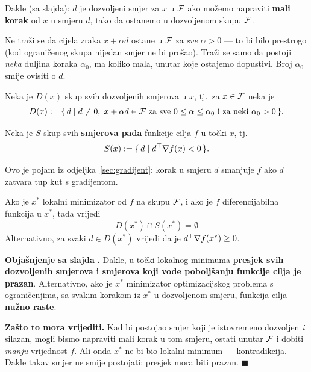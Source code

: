Dakle (sa slajda): $d$ je dozvoljeni smjer za $x$ u $\mathcal{F}$ ako možemo napraviti
\textbf{mali korak} od $x$ u smjeru $d$, tako da ostanemo u dozvoljenom skupu
$\mathcal{F}$.

\begin{napomena}
Ne traži se da cijela zraka $x + \alpha d$ ostane u $\mathcal{F}$ za \emph{sve}
$\alpha > 0$ --- to bi bilo prestrogo (kod ograničenog skupa nijedan smjer ne bi
prošao). Traži se samo da postoji \emph{neka} duljina koraka $\alpha_0$, ma
koliko mala, unutar koje ostajemo dopustivi. Broj $\alpha_0$ smije ovisiti o
$d$.
\end{napomena}

\begin{definicija}
Neka je $D(x)$ skup svih dozvoljenih smjerova u $x$, tj.\ za $x \in \mathcal{F}$ neka
je
\[
D(x) := \{\, d \mid d \ne 0,\; x + \alpha d \in \mathcal{F}
\text{ za sve } 0 \le \alpha \le \alpha_0 \text{ i za neki } \alpha_0 > 0 \,\}.
\]
\end{definicija}

\begin{definicija}
Neka je $S$ skup svih \textbf{smjerova pada} funkcije cilja $f$ u točki $x$,
tj.
\[
S(x) := \{\, d \mid d^{\top}\nabla f(x) < 0 \,\}.
\]
\end{definicija}

Ovo je pojam iz odjeljka~\ref{sec:gradijent}: korak u smjeru $d$ smanjuje $f$
ako $d$ zatvara tup kut s gradijentom.

\begin{teorem}
Ako je $x^{*}$ lokalni minimizator od $f$ na skupu $\mathcal{F}$, i ako je $f$
diferencijabilna funkcija u $x^{*}$, tada vrijedi
\[
D(x^{*}) \cap S(x^{*}) = \emptyset
\]
Alternativno, za svaki $d \in D(x^{*})$ vrijedi da je $d^{\top}\nabla f(x^{*}) \ge 0$.
\end{teorem}

\textbf{Objašnjenje sa slajda} \textbf{.} Dakle, u točki lokalnog
minimuma \textbf{presjek svih dozvoljenih smjerova i smjerova koji vode
poboljšanju funkcije cilja je prazan}. Alternativno, ako je $x^{*}$ minimizator
optimizacijskog problema s ograničenjima, sa svakim korakom iz $x^{*}$ u
dozvoljenom smjeru, funkcija cilja \textbf{nužno raste}.

\textbf{Zašto to mora vrijediti.} Kad bi postojao smjer koji je istovremeno
dozvoljen \emph{i} silazan, mogli bismo napraviti mali korak u tom smjeru,
ostati unutar $\mathcal{F}$ i dobiti \emph{manju} vrijednost $f$. Ali onda $x^{*}$ ne
bi bio lokalni minimum --- kontradikcija. Dakle takav smjer ne smije postojati:
presjek mora biti prazan. $\blacksquare$

